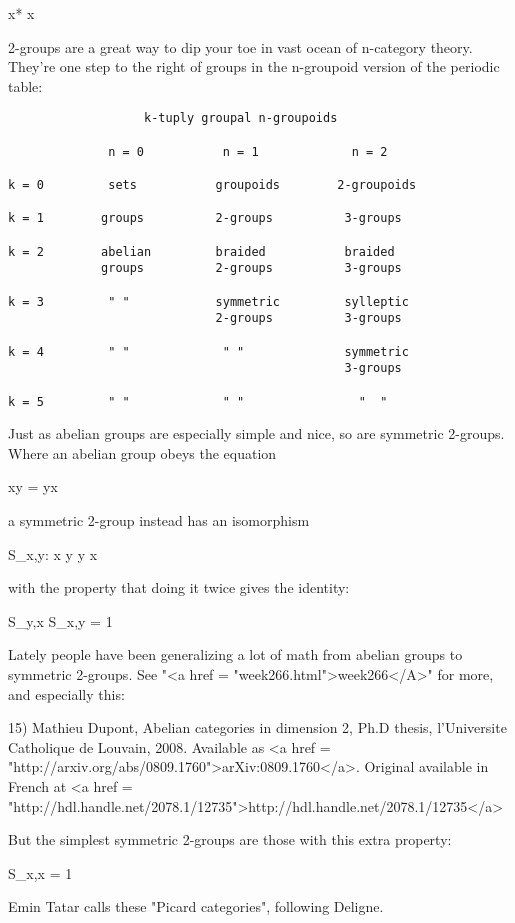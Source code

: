 x* \otimes  x 

2-groups are a great way to dip your toe in vast ocean of n-category
theory.  They're one step to the right of groups in the n-groupoid
version of the periodic table:

\begin{verbatim}
                   k-tuply groupal n-groupoids

              n = 0           n = 1             n = 2

k = 0         sets           groupoids        2-groupoids

k = 1        groups          2-groups          3-groups

k = 2        abelian         braided           braided
             groups          2-groups          3-groups

k = 3         " "            symmetric         sylleptic
                             2-groups          3-groups

k = 4         " "             " "              symmetric
                                               3-groups

k = 5         " "             " "                "  "
\end{verbatim}
    

Just as abelian groups are especially simple and nice, so are
symmetric 2-groups.  Where an abelian group obeys the equation

xy = yx

a symmetric 2-group instead has an isomorphism 

S_{x,y}: x \otimes  y \to  y \otimes  x

with the property that doing it twice gives the identity:

S_{y,x} S_{x,y} = 1

Lately people have been generalizing a lot of math from abelian
groups to symmetric 2-groups.  See "<a href = "week266.html">week266</A>" for more, and 
especially this:

15) Mathieu Dupont, Abelian categories in dimension 2, Ph.D thesis,
l'Universite Catholique de Louvain, 2008.  Available as
<a href = "http://arxiv.org/abs/0809.1760">arXiv:0809.1760</a>.
Original available in French at
<a href = "http://hdl.handle.net/2078.1/12735">http://hdl.handle.net/2078.1/12735</a>

But the simplest symmetric 2-groups are those with this extra 
property:

S_{x,x} = 1

Emin Tatar calls these "Picard categories", following Deligne.

